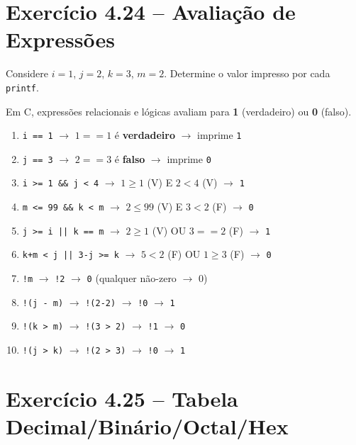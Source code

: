 \documentclass[12pt,a4paper]{article}
\begin{document}
\section{Exercício 4.24 -- Avaliação de Expressões}

\begin{enunciadoBox}[Enunciado 4.24]
Considere $i = 1$, $j = 2$, $k = 3$, $m = 2$. Determine o valor impresso por cada
\texttt{printf}.
\end{enunciadoBox}

\begin{respostabox}
Em C, expressões relacionais e lógicas avaliam para \textbf{1} (verdadeiro) ou
\textbf{0} (falso).

\begin{enumerate}[label=\textbf{\alph*)}]
\item \texttt{i == 1} $\to$ $1 == 1$ é \textbf{verdadeiro} $\to$ imprime \texttt{1}
\item \texttt{j == 3} $\to$ $2 == 3$ é \textbf{falso} $\to$ imprime \texttt{0}
\item \texttt{i >= 1 \&\& j < 4} $\to$ $1 \geq 1$ (V) E $2 < 4$ (V) $\to$ \texttt{1}
\item \texttt{m <= 99 \&\& k < m} $\to$ $2 \leq 99$ (V) E $3 < 2$ (F) $\to$ \texttt{0}
\item \texttt{j >= i || k == m} $\to$ $2 \geq 1$ (V) OU $3 == 2$ (F) $\to$ \texttt{1}
\item \texttt{k+m < j || 3-j >= k} $\to$ $5 < 2$ (F) OU $1 \geq 3$ (F) $\to$ \texttt{0}
\item \texttt{!m} $\to$ \texttt{!2} $\to$ \texttt{0} (qualquer não-zero \(\to\) 0)
\item \texttt{!(j - m)} $\to$ \texttt{!(2-2)} $\to$ \texttt{!0} $\to$ \texttt{1}
\item \texttt{!(k > m)} $\to$ \texttt{!(3 > 2)} $\to$ \texttt{!1} $\to$ \texttt{0}
\item \texttt{!(j > k)} $\to$ \texttt{!(2 > 3)} $\to$ \texttt{!0} $\to$ \texttt{1}
\end{enumerate}
\end{respostabox}

\newpage

\section{Exercício 4.25 -- Tabela Decimal/Binário/Octal/Hex}
\end{document}
